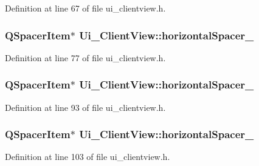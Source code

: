 Definition at line 67 of file ui\+\_\+clientview.\+h.

\hypertarget{class_ui___client_view_acb80a03d3795c11de4c7da9cdcbc0872}{}
\subsubsection[{horizontal\+Spacer\+\_\+2}]{\setlength{\rightskip}{0pt plus 5cm}Q\+Spacer\+Item$\ast$ Ui\+\_\+\+Client\+View\+::horizontal\+Spacer\+\_}\label{class_ui___client_view_acb80a03d3795c11de4c7da9cdcbc0872}


Definition at line 77 of file ui\+\_\+clientview.\+h.

\hypertarget{class_ui___client_view_a1d8e4fc5f366b60e3dabdf6de7ff1a13}{}
\subsubsection[{horizontal\+Spacer\+\_\+3}]{\setlength{\rightskip}{0pt plus 5cm}Q\+Spacer\+Item$\ast$ Ui\+\_\+\+Client\+View\+::horizontal\+Spacer\+\_}\label{class_ui___client_view_a1d8e4fc5f366b60e3dabdf6de7ff1a13}


Definition at line 93 of file ui\+\_\+clientview.\+h.

\hypertarget{class_ui___client_view_ac93522e027c7e4f5839a65aa702309f7}{}
\subsubsection[{horizontal\+Spacer\+\_\+4}]{\setlength{\rightskip}{0pt plus 5cm}Q\+Spacer\+Item$\ast$ Ui\+\_\+\+Client\+View\+::horizontal\+Spacer\+\_}\label{class_ui___client_view_ac93522e027c7e4f5839a65aa702309f7}


Definition at line 103 of file ui\+\_\+clientview.\+h.

\hypertarget{class_ui___client_view_a65f087e517845c4943ada68765528b7c}{}
